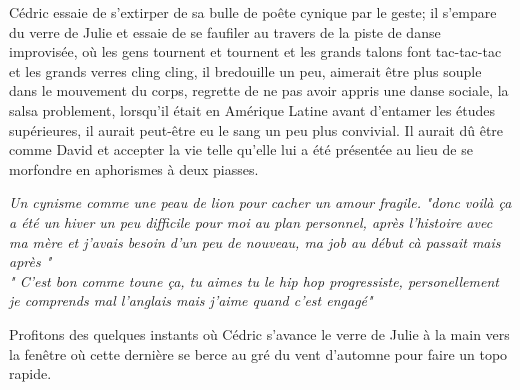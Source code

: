  \setlength{\columnsep}{4em}
\begin{paracol}{2}
Cédric essaie
de s'extirper de sa bulle de poête cynique par le geste; il s'empare du
verre de Julie et essaie de se faufiler au travers de la piste de danse
improvisée, où les gens tournent et tournent et les grands talons font
tac-tac-tac et les grands verres cling cling, il bredouille un peu, aimerait
être plus souple dans le mouvement du corps, regrette de ne pas avoir appris
une danse sociale, la salsa problement, lorsqu'il était en Amérique Latine
avant d'entamer les études supérieures, il aurait peut-être eu le sang un
peu plus convivial. Il aurait dû être comme David et accepter la vie telle
qu'elle lui a été présentée au lieu de se morfondre en aphorismes à deux
piasses. 

\emph{Un cynisme comme une peau de lion pour cacher un amour fragile.}  \switchcolumn
{} \phantom{}
\small
\textit{"\textelp{}donc voilà ça a été un hiver un peu difficile pour moi au
    plan personnel, après l'histoire avec ma mère et j'avais besoin d'un peu de
    nouveau, ma job au début cà passait mais après \textelp{}"\\[3em]
    "\textelp{} C'est bon comme toune ça, tu aimes tu le hip hop progressiste,
    personellement je comprends mal l'anglais mais j'aime quand c'est engagé"}
\end{paracol}
Profitons des quelques
instants où Cédric s'avance le verre de Julie à la main vers
la fenêtre où cette dernière se berce au gré du vent d'automne pour faire un topo
rapide. 
 \setlength{\columnsep}{4em}
